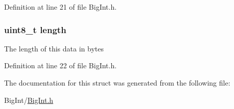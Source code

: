 Definition at line 21 of file BigInt.h.

\hypertarget{struct_m_i_big_int_ab2b3adeb2a67e656ff030b56727fd0ac}{
\subsubsection[{length}]{\setlength{\rightskip}{0pt plus 5cm}uint8\_\-t {\bf length}}}
\label{struct_m_i_big_int_ab2b3adeb2a67e656ff030b56727fd0ac}
The length of this data in bytes 

Definition at line 22 of file BigInt.h.



The documentation for this struct was generated from the following file:\begin{DoxyCompactItemize}
\item 
BigInt/\hyperlink{_m_i_big_int_8h}{BigInt.h}\end{DoxyCompactItemize}
